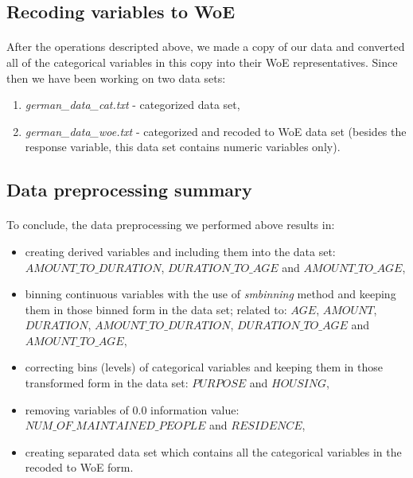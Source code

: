 \documentclass[10pt]{article}\usepackage[]{graphicx}\usepackage[]{color}
\begin{document}
\subsection{Recoding variables to WoE}
\paragraph{}
After the operations descripted above, we made a copy of our data and converted all of the categorical variables in this copy into their WoE representatives. Since then 
we have been working on two data sets: 
\begin{enumerate}
\item \textit{german\_data\_cat.txt} - categorized data set,
\item \textit{german\_data\_woe.txt} - categorized and recoded to WoE data set (besides the response variable, this data set contains numeric variables only). 
\end{enumerate}


\subsection{Data preprocessing summary}
\paragraph{}
To conclude, the data preprocessing we performed above results in: 
  \begin{itemize}
\item creating derived variables and including them into the data set: $AMOUNT\_TO\_DURATION$, $DURATION\_TO\_AGE$ and $AMOUNT\_TO\_AGE$,
\item binning continuous variables with the use of \textit{smbinning} method and keeping them in those binned form in the data set; related to: $AGE$, $AMOUNT$, $DURATION$, $AMOUNT\_TO\_DURATION$, $DURATION\_TO\_AGE$ and $AMOUNT\_TO\_AGE$,
\item correcting bins (levels) of categorical variables and keeping them in those transformed form in the data set: $PURPOSE$ and $HOUSING$,
\item removing variables of $0.0$ information value:  $NUM\_OF\_MAINTAINED\_PEOPLE$ and $RESIDENCE$,
\item creating separated data set which contains all the categorical variables in the recoded to WoE form. 
\end{itemize}
\end{document}
